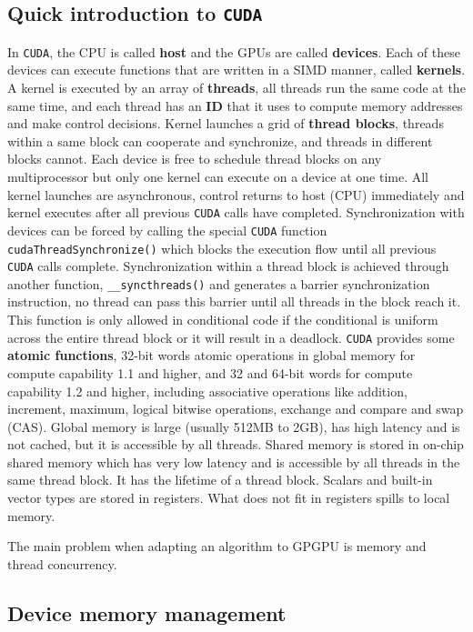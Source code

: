 \documentclass[12pt,journal,compsoc]{IEEEtran}
\begin{document}
\subsection{Quick introduction to \texttt{CUDA}}
In \texttt{CUDA}, the CPU is called \textbf{host} and the GPUs are called \textbf{devices}. 
Each of these devices can execute functions that are written in a SIMD manner, called \textbf{kernels}. 
A kernel is executed by an array of \textbf{threads}, all threads run the same code at the same time, and each thread has an \textbf{ID} that it uses to compute memory addresses and make control decisions. 
Kernel launches a grid of \textbf{thread blocks}, threads within a same block can cooperate and synchronize, and threads in different blocks cannot. 
Each device is free to schedule thread blocks on any multiprocessor but only one kernel can execute on a device at one time.
All kernel launches are asynchronous, control returns to host (CPU) immediately and kernel executes after all previous \texttt{CUDA} calls have completed.
Synchronization with devices can be forced by calling the special \texttt{CUDA} function \texttt{cudaThreadSynchronize()} which blocks the execution flow until all previous \texttt{CUDA} calls complete.
Synchronization within a thread block is achieved through another function, \texttt{\_\_syncthreads()} and generates a barrier synchronization instruction, no thread can pass this barrier until all threads in the block reach it.
This function is only allowed in conditional code if the conditional is uniform across the entire thread block or it will result in a deadlock.
\texttt{CUDA} provides some \textbf{atomic functions}, 32-bit words atomic operations in global memory for compute capability 1.1 and higher, and 32 and 64-bit words for compute capability 1.2 and higher, including associative operations like addition, increment, maximum, logical bitwise operations, exchange and compare and swap (CAS).
Global memory is large (usually 512MB to 2GB), has high latency and is not cached, but it is accessible by all threads.
Shared memory is stored in on-chip shared memory which has very low latency and is accessible by all threads in the same thread block.
It has the lifetime of a thread block.
Scalars and built-in vector types are stored in registers. What does not fit in registers spills to local memory.

The main problem when adapting an algorithm to GPGPU is memory and thread concurrency. 

\subsection{Device memory management}
\end{document}
